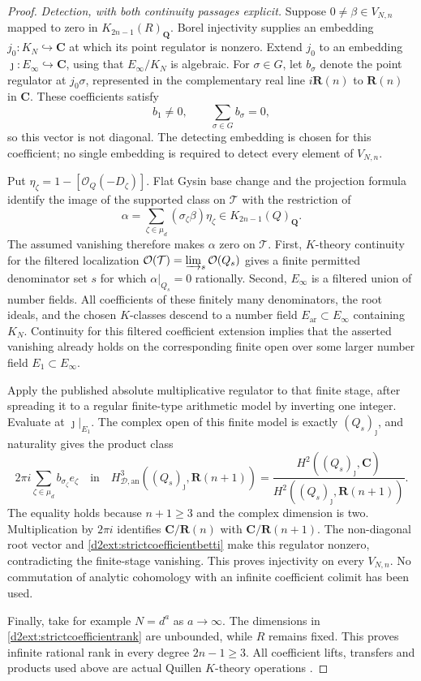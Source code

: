 \documentclass[11pt,a4paper]{amsart}
\numberwithin{equation}{section}
\theoremstyle{definition}
\theoremstyle{remark}
\newcommand{\Q}{\mathbf Q}
\newcommand{\R}{\mathbf R}
\newcommand{\C}{\mathbf C}
\begin{document}
\begin{proof}
\emph{Detection, with both continuity passages explicit.}
Suppose $0\ne\beta\in V_{N,n}$ mapped to zero in
$K_{2n-1}(R)_{\Q}$. Borel injectivity \cite[Section~6]{BunkeTamme} supplies an embedding
$j_0:K_N\hookrightarrow\C$ at which its point regulator
is nonzero. Extend $j_0$ to an embedding
$\jmath:E_\infty\hookrightarrow\C$, using that
$E_\infty/K_N$ is algebraic.
For $\sigma\in G$, let $b_\sigma$ denote the point regulator
at $j_0\sigma$, represented in the complementary real line
$i\R(n)$ to $\R(n)$ in $\C$. These coefficients satisfy
\[
 b_1\ne0,\qquad \sum_{\sigma\in G}b_\sigma=0,
\]
so this vector is not diagonal. The detecting embedding is
chosen for this coefficient; no single embedding is required
to detect every element of $V_{N,n}$.

Put $\eta_\zeta=1-[\mathcal O_Q(-D_\zeta)]$. Flat Gysin
base change and the projection formula identify the image of
the supported class on $\mathcal T$ with the restriction of
\[
 \alpha=\sum_{\zeta\in\mu_d}(\sigma_\zeta\beta)\eta_\zeta
       \in K_{2n-1}(Q)_{\Q}.
\]
The assumed vanishing therefore makes $\alpha$ zero on
$\mathcal T$. First, $K$-theory continuity for the filtered
localization
$\mathcal O(\mathcal T)=\varinjlim_s\mathcal O(Q_s)$
gives a finite permitted denominator set $s$ for which
$\alpha|_{Q_s}=0$ rationally.
Second, $E_\infty$ is a filtered union of number fields.
All coefficients of these finitely many denominators, the
root ideals, and the chosen $K$-classes descend to a number
field $E_{\mathrm{ar}}\subset E_\infty$ containing $K_N$.
Continuity for this filtered coefficient extension implies
that the asserted vanishing already holds on the corresponding
finite open over some larger number field
$E_1\subset E_\infty$.

Apply the published absolute multiplicative regulator to that
finite stage, after spreading it to a regular finite-type
arithmetic model by inverting one integer. Evaluate at
$\jmath|_{E_1}$. The complex open of this finite model is exactly
$(Q_s)_\jmath$, and naturality gives the product class
\[
 2\pi i\sum_{\zeta\in\mu_d}b_{\sigma_\zeta}e_\zeta
 \quad\text{in}\quad
 H^3_{\mathcal D,\mathrm{an}}((Q_s)_\jmath,\R(n+1))
 =\frac{H^2((Q_s)_\jmath,\C)}
        {H^2((Q_s)_\jmath,\R(n+1))}.
\]
The equality holds because $n+1\ge3$ and the complex
dimension is two. Multiplication by $2\pi i$ identifies
$\C/\R(n)$ with $\C/\R(n+1)$. The non-diagonal root
vector and \eqref{d2ext:strictcoefficientbetti} make this
regulator nonzero, contradicting the finite-stage vanishing.
This proves injectivity on every $V_{N,n}$.
No commutation of analytic cohomology with an infinite
coefficient colimit has been used.

Finally, take for example $N=d^a$ as $a\to\infty$.
The dimensions in \eqref{d2ext:strictcoefficientrank} are
unbounded, while $R$ remains fixed. This proves infinite
rational rank in every degree $2n-1\ge3$.
All coefficient lifts, transfers and products used above are
actual Quillen $K$-theory operations
\cite{Quillen,QuillenFinite,Weibel,Borel,BunkeTamme}.
\end{proof}
\end{document}
